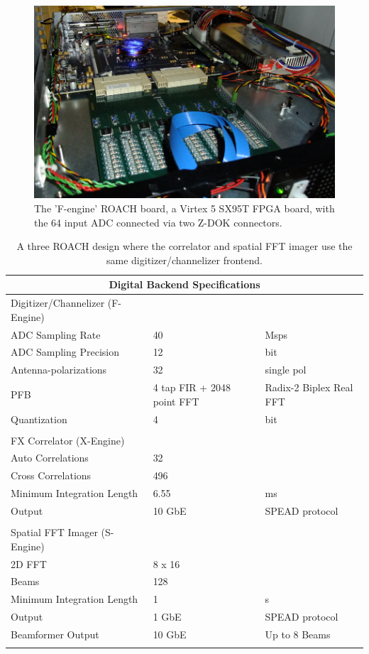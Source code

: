 \documentclass[useAMS,macros,usenatbib,onecolumn]{mn2e}
\begin{document}
\begin{figure}
    \centering
    \includegraphics[scale=0.4]{graphics/roach_feng.png}
    \caption{The 'F-engine' ROACH board, a Virtex 5 SX95T FPGA board, with the 64 input ADC connected via two Z-DOK connectors.}
    \label{fig:roach}
\end{figure}

\begin{table}
\begin{center}
\begin{tabular}{| l | l | l |}
\hline
\multicolumn{3}{|c|}{Digital Backend Specifications}\\
\hline
Digitizer/Channelizer (F-Engine) & &\\
\hline
ADC Sampling Rate	& 40 			& Msps\\
ADC Sampling Precision	& 12 			& bit \\
Antenna-polarizations 	& 32 			& single pol \\
PFB 			& 4 tap FIR + 2048 point FFT	& Radix-2 Biplex Real FFT\\
Quantization 		& 4 			& bit\\
& & \\
\hline
FX Correlator (X-Engine) & &\\
\hline
Auto Correlations 	& 32 			& \\
Cross Correlations 	& 496 			& \\
Minimum Integration Length & 6.55 		& ms\\
Output 			& 10 GbE 		& SPEAD protocol\\
& & \\
\hline
Spatial FFT Imager (S-Engine) & &\\
\hline
2D FFT 			& 8 x 16 		& \\
Beams 			& 128 			& \\
Minimum Integration Length & 1 			& s\\
Output 			& 1 GbE 		& SPEAD protocol\\
Beamformer Output 	& 10 GbE 		& Up to 8 Beams\\
& & \\
\hline
\end{tabular}
\caption{A three ROACH design where the correlator and spatial FFT imager use the same digitizer/channelizer frontend.}
\label{tbl:digital_specs}
\end{center}
\end{table}
\end{document}
